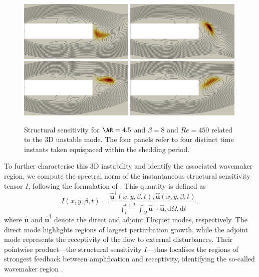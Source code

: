 \begin{figure}
  \centering
  \includegraphics[width=0.49\textwidth]{./fig/AR4p5/sens3D_25.png}
  \includegraphics[width=0.49\textwidth]{./fig/AR4p5/sens3D_50.png}
  \includegraphics[width=0.49\textwidth]{./fig/AR4p5/sens3D_75.png}
  \includegraphics[width=0.49\textwidth]{./fig/AR4p5/sens3D_100.png}
  \caption{Structural sensitivity for $\AR=4.5$ and $\beta=8$ and $Re=450$ related to the 3D unstable mode. The four panels refer to four distinct time instants taken equispaced within the shedding period.}
  \label{fig:ss3d}
\end{figure}

To further characterise this 3D instability and identify the associated wavemaker region, we compute the spectral norm of the instantaneous structural sensitivity tensor $I$, following the formulation of \cite{giannetti-camarri-luchini-2010}. This quantity is defined as
%
\begin{equation}
I(x, y, \beta, t) = \frac{ \hat{\bm{u}}^\dagger(x, y, \beta, t), \hat{\bm{u}}(x, y, \beta, t) }{ \int_t^{t+T} \int_{\Omega} \hat{\bm{u}}^\dagger \cdot \hat{\bm{u}}, \mathrm{d}\Omega, \mathrm{d}t },
\end{equation}
%
where $\hat{\bm{u}}$ and $\hat{\bm{u}}^\dagger$ denote the direct and adjoint Floquet modes, respectively. The direct mode highlights regions of largest perturbation growth, while the adjoint mode represents the receptivity of the flow to external disturbances. Their pointwise product---the structural sensitivity $I$---thus localises the regions of strongest feedback between amplification and receptivity, identifying the so-called wavemaker region \citep{monkewitz-huerre-chomaz-1993}.


